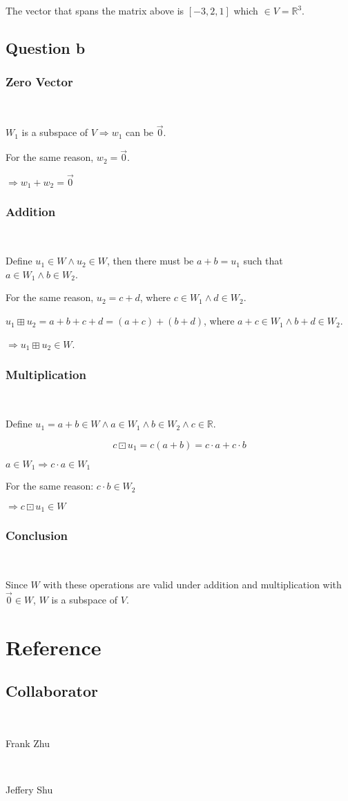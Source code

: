 \documentclass{article}
\def\R{\mathbb{R}}
\begin{document}
The vector that spans the matrix above is $[-3,2,1]$ which $\in V=\R^3$.

\subsection{Question b}

\subsubsection{Zero Vector}

~

$W_1$ is a subspace of $V \Rightarrow w_1$ can be $\overrightarrow{0}$.

For the same reason, $w_2=\overrightarrow{0}$.

$\Rightarrow w_1+w_2=\overrightarrow{0}$

\subsubsection{Addition}

~

Define $u_1\in W \land u_2\in W$, then there must be $a+b=u_1$ such that $a\in W_1\land b\in W_2$.

For the same reason, $u_2 =c+d$, where $c\in W_1 \land d\in W_2$.

$u_1 \boxplus u_2 = a+b+c+d=(a+c)+(b+d)$, where $a+c \in W_1\land b+d\in W_2$.

$\Rightarrow u_1 \boxplus u_2 \in W$.

\subsubsection{Multiplication}

~

Define $u_1=a+b\in W \land a \in W_1\land b\in W_2\land c\in \R$.

$$
c\boxdot u_1 = c(a+b)= c\cdot a+c\cdot b
$$

$a \in W_1 \Rightarrow c\cdot a\in W_1$

For the same reason: $c\cdot b\in W_2$

$\Rightarrow c \boxdot u_1 \in W$

\subsubsection{Conclusion}

~

Since $W$ with these operations are valid under addition and multiplication with $\overrightarrow{0} \in W$, $W$ is a subspace of $V$.

\newpage
 
\section{Reference}

\subsection{Collaborator}

~

Frank Zhu

~

Jeffery Shu
\end{document}
